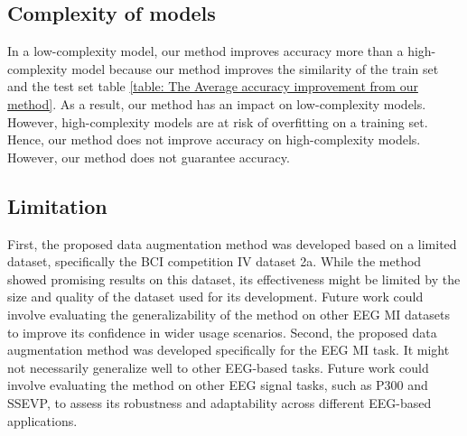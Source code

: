 \documentclass[12pt]{iopart}
\begin{document}
\begin{table}[ht] 
\centering
\caption{ The Average accuracy improvement from our method.}\label{table: The Average accuracy improvement from our method}
\end{table}

\subsection{Complexity of models}

In a low-complexity model, our method improves accuracy more than a high-complexity model because our method improves the similarity of the train set and the test set table \ref{table: The Average accuracy improvement from our method}. As a result, our method has an impact on low-complexity models. However, high-complexity models are at risk of overfitting on a training set. Hence, our method does not improve accuracy on high-complexity models. However, our method does not guarantee accuracy.


\subsection{Limitation}
First, the proposed data augmentation method was developed based on a limited dataset, specifically the BCI competition IV dataset 2a. While the method showed promising results on this dataset, its effectiveness might be limited by the size and quality of the dataset used for its development. Future work could involve evaluating the generalizability of the method on other EEG MI datasets to improve its confidence in wider usage scenarios.  Second, the proposed data augmentation method was developed specifically for the EEG MI task. It might not necessarily generalize well to other EEG-based tasks. Future work could involve evaluating the method on other EEG signal tasks, such as P300 and SSEVP, to assess its robustness and adaptability across different EEG-based applications.
\end{document}
